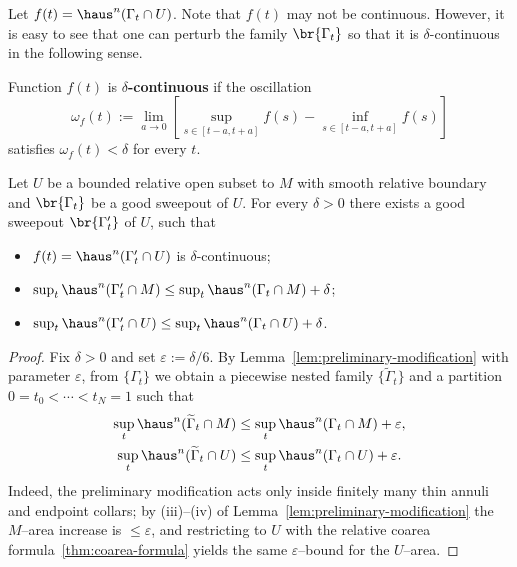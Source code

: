 Let $f(t) = \haus^n(\Gamma_t\cap U)$. Note that $f(t)$ may not be continuous. However, it is easy
to see that one can perturb the family $\br{\Gamma_t}$ so that it is $\delta$-continuous in the
following sense.
\begin{definition}
    Function $f(t)$ is \textbf{$\delta$-continuous} if the oscillation
    \begin{equation*}
        \omega_f(t) := \lim_{a \to 0}[\sup_{s \in [t - a, t + a]}f(s) - \inf_{s \in [t - a, t + a]}f(s)]
    \end{equation*}
    satisfies $\omega_f(t) < \delta$ for every $t$.
\end{definition}
\begin{lemma}\label{lem:delta-cts-perturbation}
    Let $U$ be a bounded relative open subset to $M$ with smooth relative boundary and $\br{\Gamma_t}$ be a good sweepout of $U$. For every $\delta > 0$ there exists a good sweepout $\br{\Gamma'_t}$ of $U$, such that 
    \begin{itemize}
        \item $f(t) = \haus^n(\Gamma_t'\cap U)$ is $\delta$-continuous;
        \item $\sup_{t}\haus^n(\Gamma_t'\cap M) \leq \sup_{t}\haus^n(\Gamma_t\cap M) + \delta$;
        \item $\sup_{t}\haus^n(\Gamma_t'\cap U) \leq \sup_{t}\haus^n(\Gamma_t\cap U) + \delta$.
    \end{itemize}
    \begin{proof}
        Fix $\delta>0$ and set $\varepsilon:=\delta/6$.
        By Lemma~\ref{lem:preliminary-modification} with parameter $\varepsilon$, from $\{\Gamma_t\}$ we obtain a piecewise nested family $\{\widetilde{\Gamma}_t\}$ and a partition $0=t_0<\cdots<t_N=1$ such that
        \begin{equation*}
        \begin{split}
        \sup_{t}\haus^n(\widetilde{\Gamma}_t\cap M)
        &\le \sup_{t}\haus^n(\Gamma_t\cap M)+\varepsilon,\\
        \sup_{t}\haus^n(\widetilde{\Gamma}_t\cap U)
        &\le \sup_{t}\haus^n(\Gamma_t\cap U)+\varepsilon.
        \end{split}
        \end{equation*}
        Indeed, the preliminary modification acts only inside finitely many thin annuli and endpoint collars; by (iii)–(iv) of Lemma~\ref{lem:preliminary-modification} the $M$–area increase is $\le\varepsilon$, and restricting to $U$ with the relative coarea formula~\ref{thm:coarea-formula} yields the same $\varepsilon$–bound for the $U$–area.
    

\end{proof}
\end{lemma}
